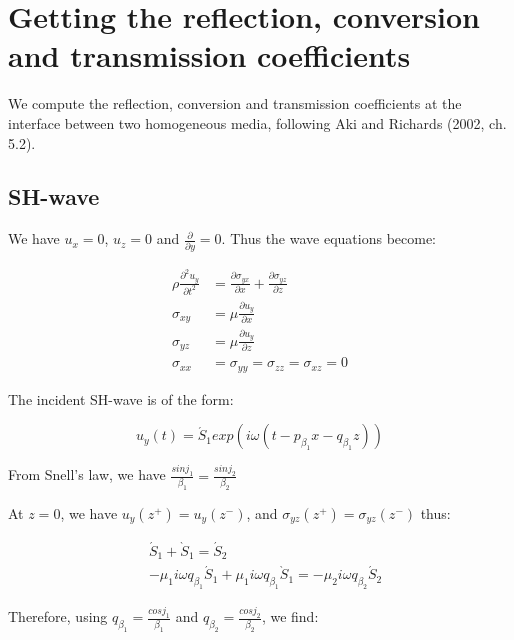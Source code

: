 \documentclass[main.tex]{subfiles}
\begin{document}
\section{Getting the reflection, conversion and transmission coefficients}

We compute the reflection, conversion and transmission coefficients at the interface between two homogeneous media, following Aki and Richards (2002, ch. 5.2).

\subsection{SH-wave}

We have $u_x = 0$, $u_z = 0$ and $\frac{\partial}{\partial y} = 0$. Thus the wave equations become:

\begin{equation}
\begin{split}
\rho \frac{\partial ^2 u_y}{\partial t^2} & = \frac{\partial \sigma_{yx}}{\partial x} + \frac{\partial \sigma_{yz}}{\partial z} \\
\sigma_{xy} & = \mu \frac{\partial u_y}{\partial x} \\
\sigma_{yz} & = \mu \frac{\partial u_y}{\partial z} \\
\sigma_{xx} & = \sigma_{yy} = \sigma_{zz} = \sigma_{xz} = 0
\end{split}
\end{equation}

The incident SH-wave is of the form:

\begin{equation}
u_y (t) = \acute S_1 exp (i \omega (t - p_{\beta_1} x - q_{\beta_1} z))
\end{equation}

From Snell's law, we have $\frac{sin j_1}{\beta_1} = \frac{sin j_2}{\beta_2}$

At $z = 0$, we have $u_y (z^+) = u_y (z^-)$, and $\sigma_{yz} (z^+) = \sigma_{yz} (z^-)$ thus:

\begin{equation}
\begin{split}
& \acute S_1 + \grave S_1 = \acute S_2 \\
& - \mu_1 i \omega q_{\beta_1} \acute S_1 + \mu_1 i \omega q_{\beta_1} \grave S_1 = - \mu_2 i \omega q_{\beta_2} \acute S_2
\end{split}
\end{equation}

Therefore, using $q_{\beta_1} = \frac{cos j_1}{\beta_1}$ and $q_{\beta_2} = \frac{cos j_2}{\beta_2}$, we find:
\end{document}
